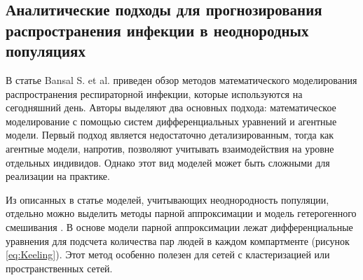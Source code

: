 \documentclass[14pt,a4paper]{article}
\begin{document}
\subsection{Аналитические подходы для прогнозирования распространения инфекции в неоднородных популяциях}

В статье Bansal S. et al. \cite{Bansal} приведен обзор методов математического моделирования распространения респираторной инфекции, которые используются на сегодняшний день.  Авторы выделяют два основных подхода: математическое моделирование с помощью систем дифференциальных уравнений и агентные модели.
Первый подход является недостаточно детализированным, тогда как агентные модели, напротив, позволяют учитывать взаимодействия на уровне отдельных индивидов. Однако этот вид моделей может быть сложными для реализации на практике.

Из описанных в статье моделей, учитывающих неоднородность популяции, отдельно можно выделить методы парной аппроксимации \cite{Keeling} и модель гетерогенного смешивания \cite{Moreno}. В основе модели парной аппроксимации лежат дифференциальные уравнения для подсчета количества пар людей в каждом компартменте (рисунок \ref{eq:Keeling}). Этот метод особенно полезен для сетей с кластеризацией или пространственных сетей.
\end{document}

